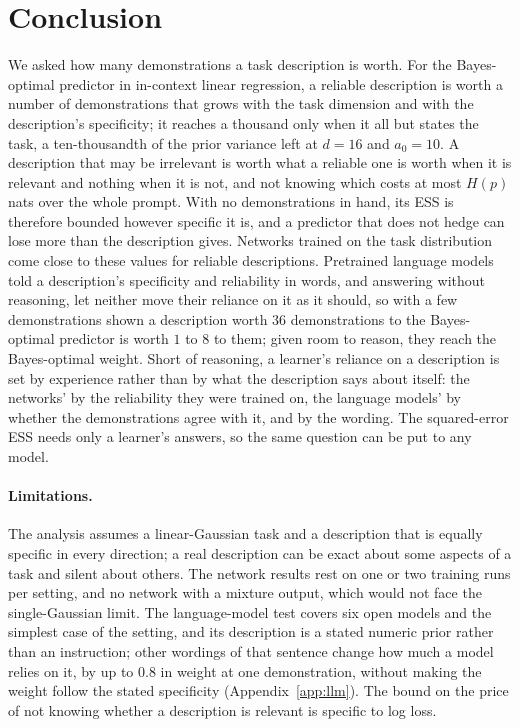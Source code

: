 \documentclass{article}
\begin{document}
\section{Conclusion}
We asked how many demonstrations a task description is worth. For the Bayes-optimal predictor in in-context linear regression, a reliable description is worth a number of demonstrations that grows with the task dimension and with the description's specificity; it reaches a thousand only when it all but states the task, a ten-thousandth of the prior variance left at $d = 16$ and $a_0 = 10$. A description that may be irrelevant is worth what a reliable one is worth when it is relevant and nothing when it is not, and not knowing which costs at most $H(p)$ nats over the whole prompt. With no demonstrations in hand, its ESS is therefore bounded however specific it is, and a predictor that does not hedge can lose more than the description gives. Networks trained on the task distribution come close to these values for reliable descriptions. Pretrained language models told a description's specificity and reliability in words, and answering without reasoning, let neither move their reliance on it as it should, so with a few demonstrations shown a description worth $36$ demonstrations to the Bayes-optimal predictor is worth $1$ to $8$ to them; given room to reason, they reach the Bayes-optimal weight. Short of reasoning, a learner's reliance on a description is set by experience rather than by what the description says about itself: the networks' by the reliability they were trained on, the language models' by whether the demonstrations agree with it, and by the wording. The squared-error ESS needs only a learner's answers, so the same question can be put to any model.

\paragraph{Limitations.} The analysis assumes a linear-Gaussian task and a description that is equally specific in every direction; a real description can be exact about some aspects of a task and silent about others. The network results rest on one or two training runs per setting, and no network with a mixture output, which would not face the single-Gaussian limit. The language-model test covers six open models and the simplest case of the setting, and its description is a stated numeric prior rather than an instruction; other wordings of that sentence change how much a model relies on it, by up to $0.8$ in weight at one demonstration, without making the weight follow the stated specificity (Appendix~\ref{app:llm}). The bound on the price of not knowing whether a description is relevant is specific to log loss.
\end{document}
